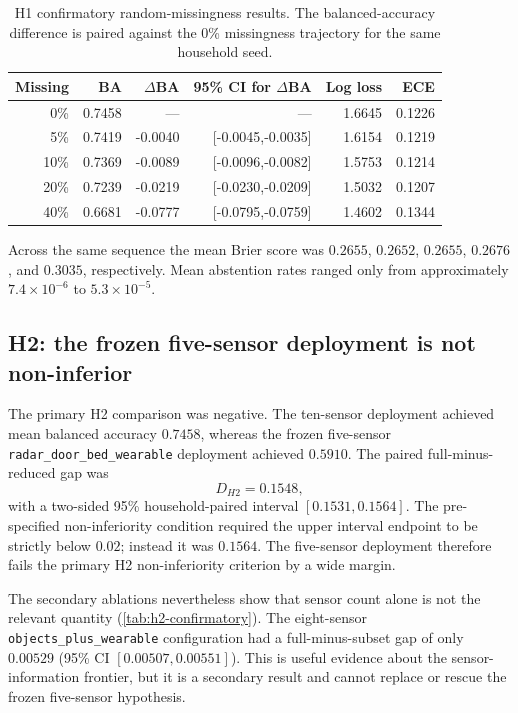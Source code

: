 \begin{table}[t]
\centering
\small
\caption{H1 confirmatory random-missingness results. The balanced-accuracy difference is paired against the 0\% missingness trajectory for the same household seed.}
\label{tab:h1-confirmatory}
\begin{tabular}{rrrrrr}
\toprule
Missing & BA & $\Delta$BA & 95\% CI for $\Delta$BA & Log loss & ECE \\
\midrule
0\%  & 0.7458 & ---     & ---                    & 1.6645 & 0.1226 \\
5\%  & 0.7419 & -0.0040 & [-0.0045,-0.0035]     & 1.6154 & 0.1219 \\
10\% & 0.7369 & -0.0089 & [-0.0096,-0.0082]     & 1.5753 & 0.1214 \\
20\% & 0.7239 & -0.0219 & [-0.0230,-0.0209]     & 1.5032 & 0.1207 \\
40\% & 0.6681 & -0.0777 & [-0.0795,-0.0759]     & 1.4602 & 0.1344 \\
\bottomrule
\end{tabular}
\end{table}

Across the same sequence the mean Brier score was $0.2655$, $0.2652$, $0.2655$, $0.2676$, and $0.3035$, respectively. Mean abstention rates ranged only from approximately $7.4\times10^{-6}$ to $5.3\times10^{-5}$.

\subsection{H2: the frozen five-sensor deployment is not non-inferior}

The primary H2 comparison was negative. The ten-sensor deployment achieved mean balanced accuracy $0.7458$, whereas the frozen five-sensor \texttt{radar\_door\_bed\_wearable} deployment achieved $0.5910$. The paired full-minus-reduced gap was
\begin{equation}
D_{H2}=0.1548,
\end{equation}
with a two-sided 95\% household-paired interval $[0.1531,0.1564]$. The pre-specified non-inferiority condition required the upper interval endpoint to be strictly below $0.02$; instead it was $0.1564$. The five-sensor deployment therefore fails the primary H2 non-inferiority criterion by a wide margin.

The secondary ablations nevertheless show that sensor count alone is not the relevant quantity (\cref{tab:h2-confirmatory}). The eight-sensor \texttt{objects\_plus\_wearable} configuration had a full-minus-subset gap of only $0.00529$ (95\% CI $[0.00507,0.00551]$). This is useful evidence about the sensor-information frontier, but it is a secondary result and cannot replace or rescue the frozen five-sensor hypothesis.

